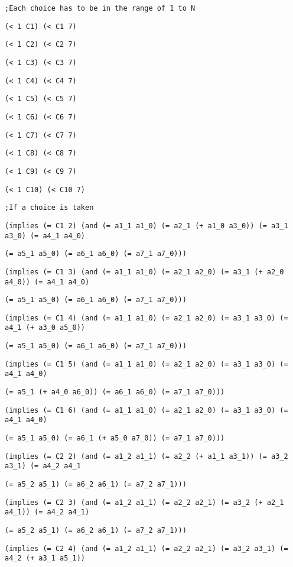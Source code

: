 {{\tt ;Each choice has to be in the range of 1 to N}

{\tt (< 1 C1) (< C1 7)}

{\tt (< 1 C2) (< C2 7)}

{\tt (< 1 C3) (< C3 7)}

{\tt (< 1 C4) (< C4 7)}

{\tt (< 1 C5) (< C5 7)}

{\tt (< 1 C6) (< C6 7)}

{\tt (< 1 C7) (< C7 7)}

{\tt (< 1 C8) (< C8 7)}

{\tt (< 1 C9) (< C9 7)}

{\tt (< 1 C10) (< C10 7)}

{\tt ;If a choice is taken}

{\tt (implies (= C1 2)  (and (= a1\_1 a1\_0) (= a2\_1 (+ a1\_0 a3\_0)) (= a3\_1 a3\_0) (= a4\_1 a4\_0)}

{\tt (= a5\_1 a5\_0) (= a6\_1 a6\_0) (= a7\_1 a7\_0)))}

{\tt (implies (= C1 3)  (and (= a1\_1 a1\_0) (= a2\_1 a2\_0) (= a3\_1 (+ a2\_0 a4\_0)) (= a4\_1 a4\_0)}

{\tt (= a5\_1 a5\_0) (= a6\_1 a6\_0) (= a7\_1 a7\_0)))}

{\tt (implies (= C1 4)  (and (= a1\_1 a1\_0) (= a2\_1 a2\_0) (= a3\_1 a3\_0) (= a4\_1 (+ a3\_0 a5\_0))}

{\tt (= a5\_1 a5\_0) (= a6\_1 a6\_0) (= a7\_1 a7\_0)))}

{\tt (implies (= C1 5)  (and (= a1\_1 a1\_0) (= a2\_1 a2\_0) (= a3\_1 a3\_0) (= a4\_1 a4\_0)}

{\tt  (= a5\_1 (+ a4\_0 a6\_0)) (= a6\_1 a6\_0) (= a7\_1 a7\_0)))}

{\tt (implies (= C1 6)  (and (= a1\_1 a1\_0) (= a2\_1 a2\_0) (= a3\_1 a3\_0) (= a4\_1 a4\_0) }

{\tt (= a5\_1 a5\_0) (= a6\_1 (+ a5\_0 a7\_0)) (= a7\_1 a7\_0)))}

{\tt }

{\tt (implies (= C2 2)  (and (= a1\_2 a1\_1) (= a2\_2 (+ a1\_1 a3\_1)) (= a3\_2 a3\_1) (= a4\_2 a4\_1}

{\tt  (= a5\_2 a5\_1) (= a6\_2 a6\_1) (= a7\_2 a7\_1)))}

{\tt (implies (= C2 3)  (and (= a1\_2 a1\_1) (= a2\_2 a2\_1) (= a3\_2 (+ a2\_1 a4\_1)) (= a4\_2 a4\_1)}

{\tt  (= a5\_2 a5\_1) (= a6\_2 a6\_1) (= a7\_2 a7\_1)))}

{\tt (implies (= C2 4)  (and (= a1\_2 a1\_1) (= a2\_2 a2\_1) (= a3\_2 a3\_1) (= a4\_2 (+ a3\_1 a5\_1))}

}
